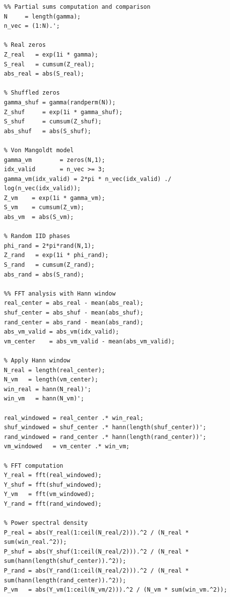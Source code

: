 \documentclass[11pt]{amsart}
\begin{document}
{\small 
\begin{verbatim}
%% Partial sums computation and comparison
N     = length(gamma);
n_vec = (1:N).';

% Real zeros
Z_real   = exp(1i * gamma);
S_real   = cumsum(Z_real);
abs_real = abs(S_real);

% Shuffled zeros
gamma_shuf = gamma(randperm(N));
Z_shuf     = exp(1i * gamma_shuf);
S_shuf     = cumsum(Z_shuf);
abs_shuf   = abs(S_shuf);

% Von Mangoldt model
gamma_vm        = zeros(N,1);
idx_valid       = n_vec >= 3;
gamma_vm(idx_valid) = 2*pi * n_vec(idx_valid) ./ log(n_vec(idx_valid));
Z_vm    = exp(1i * gamma_vm);
S_vm    = cumsum(Z_vm);
abs_vm  = abs(S_vm);

% Random IID phases
phi_rand = 2*pi*rand(N,1);
Z_rand   = exp(1i * phi_rand);
S_rand   = cumsum(Z_rand);
abs_rand = abs(S_rand);

%% FFT analysis with Hann window
real_center = abs_real - mean(abs_real);
shuf_center = abs_shuf - mean(abs_shuf);
rand_center = abs_rand - mean(abs_rand);
abs_vm_valid = abs_vm(idx_valid);
vm_center    = abs_vm_valid - mean(abs_vm_valid);

% Apply Hann window
N_real = length(real_center);
N_vm   = length(vm_center);
win_real = hann(N_real)';
win_vm   = hann(N_vm)';

real_windowed = real_center .* win_real;
shuf_windowed = shuf_center .* hann(length(shuf_center))';
rand_windowed = rand_center .* hann(length(rand_center))';
vm_windowed   = vm_center .* win_vm;

% FFT computation
Y_real = fft(real_windowed);
Y_shuf = fft(shuf_windowed);
Y_vm   = fft(vm_windowed);
Y_rand = fft(rand_windowed);

% Power spectral density
P_real = abs(Y_real(1:ceil(N_real/2))).^2 / (N_real * sum(win_real.^2));
P_shuf = abs(Y_shuf(1:ceil(N_real/2))).^2 / (N_real * sum(hann(length(shuf_center)).^2));
P_rand = abs(Y_rand(1:ceil(N_real/2))).^2 / (N_real * sum(hann(length(rand_center)).^2));
P_vm   = abs(Y_vm(1:ceil(N_vm/2))).^2 / (N_vm * sum(win_vm.^2));
\end{verbatim}
}
\end{document}
